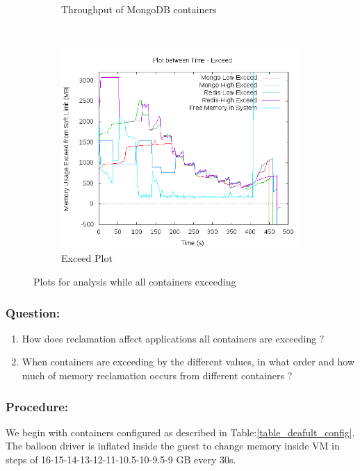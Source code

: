 \begin{figure}[t!]
\begin{subfigure}[t]{0.48\textwidth}
	    \caption{Throughput of MongoDB containers}
	    \label{plot_inference_above_sl_mongo}
	  \end{subfigure}
	  ~ 
	  \begin{subfigure}[t]{0.48\textwidth}
	    \centering
	    \includegraphics[width=1\textwidth]{images/inference/above_sl.png}
	    \caption{Exceed Plot}
	    \label{plot_inference_above_sl}
	  \end{subfigure}
	  \caption{Plots for analysis while all containers exceeding}
	\end{figure}
	
	\subsubsection{Question:}
	  \begin{enumerate}	    
	    \item How does reclamation affect applications all containers are exceeding ?
	    \item When containers are exceeding by the different values, in what order and how much of memory reclamation occurs from 
different containers ?
	  \end{enumerate}	
	
	\subsubsection{Procedure:}
	  We begin with containers configured as described in Table:\ref{table_deafult_config}. The balloon driver is inflated inside the 
guest to change memory inside VM in steps of 16-15-14-13-12-11-10.5-10-9.5-9 GB every 30s. 
	
